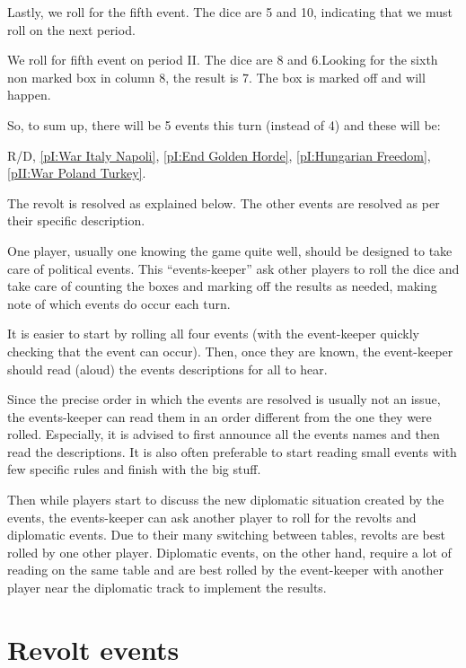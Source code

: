 \begin{exemple}
  Lastly, we roll for the fifth event. The dice are 5 and 10, indicating
  that we must roll on the next period.

  We roll for fifth event on period II. The dice are 8 and 6.Looking for
  the sixth non marked box in column 8, the result is 7. The box is
  marked off and  will happen.

  So, to sum up, there will be 5 events this turn (instead of 4) and
  these will be:\par
  R/D, \ref{pI:War Italy Napoli}, \ref{pI:End Golden Horde},
  \ref{pI:Hungarian Freedom}, \ref{pII:War Poland Turkey}.

  The revolt is resolved as explained below. The other events are
  resolved as per their specific description.
\end{exemple}

\begin{playtip}
  One player, usually one knowing the game quite well, should be
  designed to take care of political events. This ``events-keeper'' ask
  other players to roll the dice and take care of counting the boxes and
  marking off the results as needed, making note of which events do
  occur each turn.

  It is easier to start by rolling all four events (with the
  event-keeper quickly checking that the event can occur). Then, once
  they are known, the event-keeper should read (aloud) the events
  descriptions for all to hear.

  Since the precise order in which the events are resolved is usually
  not an issue, the events-keeper can read them in an order different
  from the one they were rolled. Especially, it is advised to first
  announce all the events names and then read the descriptions. It is
  also often preferable to start reading small events with few
  specific rules and finish with the big stuff.

  Then while players start to discuss the new diplomatic situation
  created by the events, the events-keeper can ask another player to
  roll for the revolts and diplomatic events. Due to their many
  switching between tables, revolts are best rolled by one other
  player. Diplomatic events, on the other hand, require a lot of reading
  on the same table and are best rolled by the event-keeper with another
  player near the diplomatic track to implement the results.
\end{playtip}




\section{Revolt events}\label{chEvents:Revolts}

